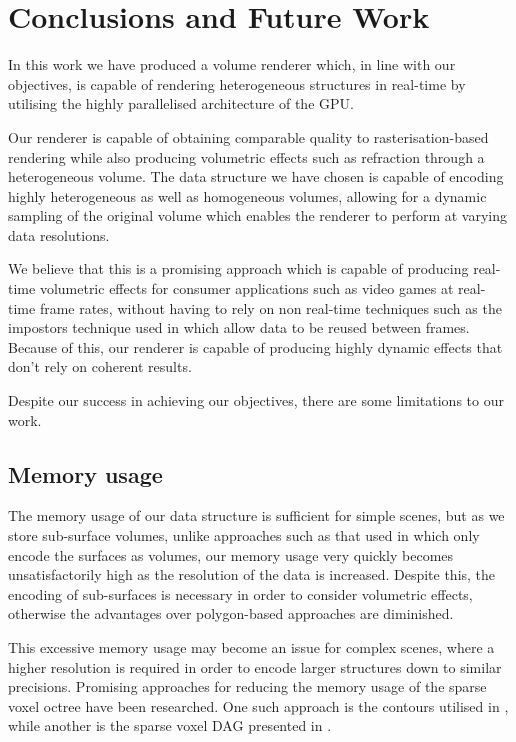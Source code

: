 \chapter{Conclusions and Future Work}
\label{conclusion}
In this work we have produced a volume renderer which, in line with our objectives, is capable of rendering heterogeneous structures in real-time by utilising the highly parallelised architecture of the GPU.

Our renderer is capable of obtaining comparable quality to rasterisation-based rendering while also producing volumetric effects such as refraction through a heterogeneous volume. The data structure we have chosen is capable of encoding highly heterogeneous as well as homogeneous volumes, allowing for a dynamic sampling of the original volume which enables the renderer to perform at varying data resolutions.

We believe that this is a promising approach which is capable of producing real-time volumetric effects for consumer applications such as video games at real-time frame rates, without having to rely on non real-time techniques such as the impostors technique used in \cite{harris02real} which allow data to be reused between frames. Because of this, our renderer is capable of producing highly dynamic effects that don't rely on coherent results.

Despite our success in achieving our objectives, there are some limitations to our work.

\section{Memory usage}
The memory usage of our data structure is sufficient for simple scenes, but as we store sub-surface volumes, unlike approaches such as that used in \cite{laine10efficientsvos} which only encode the surfaces as volumes, our memory usage very quickly becomes unsatisfactorily high as the resolution of the data is increased. Despite this, the encoding of sub-surfaces is necessary in order to consider volumetric effects, otherwise the advantages over polygon-based approaches are diminished.

This excessive memory usage may become an issue for complex scenes, where a higher resolution is required in order to encode larger structures down to similar precisions. Promising approaches for reducing the memory usage of the sparse voxel octree have been researched. One such approach is the contours utilised in \cite{laine10efficientsvos}, while another is the sparse voxel DAG presented in \cite{kampe2013dags}.

